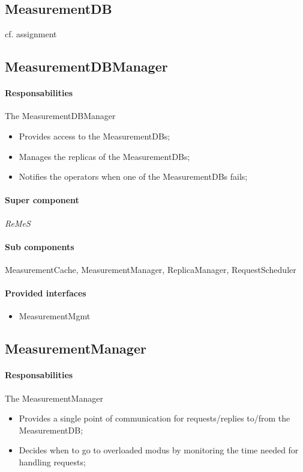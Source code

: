 \documentclass[a4paper,10pt]{article}
\newcommand{\rem}{\emph{ReMeS}\xspace}
\begin{document}
\subsection{MeasurementDB}
cf. assignment

\subsection{MeasurementDBManager}
\paragraph{Responsabilities} 
The MeasurementDBManager
\begin{itemize}
	\item Provides access to the MeasurementDBs;
    \item Manages the replicas of the MeasurementDBs;
    \item Notifies the operators when one of the MeasurementDBs fails;
\end{itemize}

\paragraph{Super component} \rem

\paragraph{Sub components} MeasurementCache, MeasurementManager, ReplicaManager, RequestScheduler

\paragraph{Provided interfaces}
\begin{itemize}
    \item MeasurementMgmt
\end{itemize}

\subsection{MeasurementManager}
\paragraph{Responsabilities} 
The MeasurementManager
\begin{itemize}
	\item Provides a single point of communication for requests/replies to/from the MeasurementDB;
    \item Decides when to go to overloaded modus by monitoring the time needed for handling requests;
\end{itemize}
\end{document}
